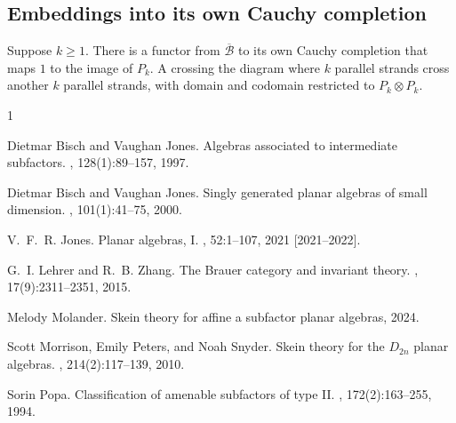 \documentclass{article}
\begin{document}
\subsection{Embeddings into its own Cauchy completion}

Suppose $k \ge 1$.  There is a functor from $\overline{\mathcal{B}}$ to
its own Cauchy completion that maps $1$ to the image of $P_k$.  A crossing
the diagram where $k$ parallel strands cross another $k$ parallel strands,
with domain and codomain restricted to $P_k \otimes P_k$.


\begin{thebibliography}{1}

Dietmar Bisch and Vaughan Jones.
\newblock Algebras associated to intermediate subfactors.
, 128(1):89--157, 1997.

Dietmar Bisch and Vaughan Jones.
\newblock Singly generated planar algebras of small dimension.
, 101(1):41--75, 2000.

V.~F.~R. Jones.
\newblock Planar algebras, {I}.
, 52:1--107, 2021 [2021--2022].

G.~I. Lehrer and R.~B. Zhang.
\newblock The {B}rauer category and invariant theory.
, 17(9):2311--2351, 2015.

Melody Molander.
\newblock Skein theory for affine a subfactor planar algebras, 2024.

Scott Morrison, Emily Peters, and Noah Snyder.
\newblock Skein theory for the {$D_{2n}$} planar algebras.
, 214(2):117--139, 2010.

Sorin Popa.
\newblock Classification of amenable subfactors of type {II}.
, 172(2):163--255, 1994.

\end{thebibliography}
\end{document}
